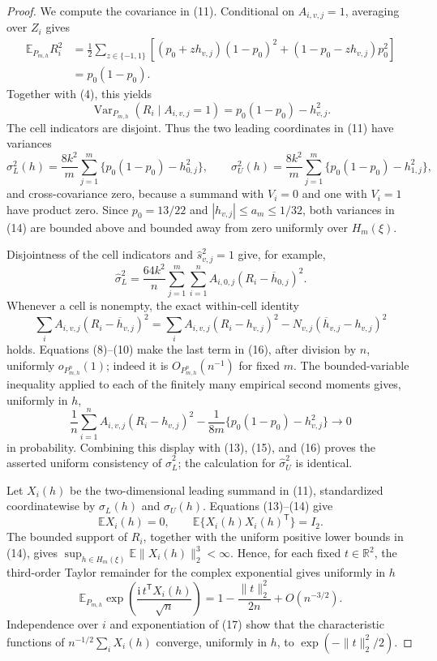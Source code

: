 \documentclass{article}
\begin{document}
\begin{proof}
We compute the covariance in (11). Conditional on \(A_{i,v,j}=1\), averaging over \(Z_i\) gives
\[
 \begin{split}
 \mathbb E_{P_{m,h}}R_i^2
 &=\frac12\sum_{z\in\{-1,1\}}
 \left[(p_0+zh_{v,j})(1-p_0)^2+(1-p_0-zh_{v,j})p_0^2\right]\\
 &=p_0(1-p_0).
 \end{split}                                                            \tag{12}
\]
Together with (4), this yields
\[
 \operatorname{Var}_{P_{m,h}}(R_i\mid A_{i,v,j}=1)
 =p_0(1-p_0)-h_{v,j}^2.                                                  \tag{13}
\]
The cell indicators are disjoint. Thus the two leading coordinates in (11) have variances
\[
 \sigma_L^2(h)=\frac{8k^2}{m}\sum_{j=1}^{m}\{p_0(1-p_0)-h_{0,j}^2\},
 \qquad
 \sigma_U^2(h)=\frac{8k^2}{m}\sum_{j=1}^{m}\{p_0(1-p_0)-h_{1,j}^2\},    \tag{14}
\]
and cross-covariance zero, because a summand with \(V_i=0\) and one with \(V_i=1\) have product zero. Since \(p_0=13/22\) and \(|h_{v,j}|\leq a_m\leq1/32\), both variances in (14) are bounded above and bounded away from zero uniformly over \(H_m(\xi)\).

Disjointness of the cell indicators and \(\widehat s_{v,j}^2=1\) give, for example,
\[
 \widehat\sigma_L^2
 =\frac{64k^2}{n}\sum_{j=1}^{m}\sum_{i=1}^{n}
 A_{i,0,j}(R_i-\overline h_{0,j})^2.                                    \tag{15}
\]
Whenever a cell is nonempty, the exact within-cell identity
\[
 \sum_iA_{i,v,j}(R_i-\overline h_{v,j})^2
 =\sum_iA_{i,v,j}(R_i-h_{v,j})^2
 -N_{v,j}(\overline h_{v,j}-h_{v,j})^2                                  \tag{16}
\]
holds. Equations (8)--(10) make the last term in (16), after division by \(n\), uniformly \(o_{P_{m,h}^{n}}(1)\); indeed it is \(O_{P_{m,h}^{n}}(n^{-1})\) for fixed \(m\). The bounded-variable inequality applied to each of the finitely many empirical second moments gives, uniformly in \(h\),
\[
 \frac1n\sum_{i=1}^{n}A_{i,v,j}(R_i-h_{v,j})^2
 -\frac1{8m}\{p_0(1-p_0)-h_{v,j}^2\}
 \longrightarrow0
\]
in probability. Combining this display with (13), (15), and (16) proves the asserted uniform consistency of \(\widehat\sigma_L^2\); the calculation for \(\widehat\sigma_U^2\) is identical.

Let \(X_i(h)\) be the two-dimensional leading summand in (11), standardized coordinatewise by \(\sigma_L(h)\) and \(\sigma_U(h)\). Equations (13)--(14) give
\[
 \mathbb E X_i(h)=0,
 \qquad \mathbb E\{X_i(h)X_i(h)^{\mathsf T}\}=I_2.
\]
The bounded support of \(R_i\), together with the uniform positive lower bounds in (14), gives \(\sup_{h\in H_m(\xi)}\mathbb E\|X_i(h)\|_2^3<\infty\). Hence, for each fixed \(t\in\mathbb R^2\), the third-order Taylor remainder for the complex exponential gives uniformly in \(h\)
\[
 \mathbb E_{P_{m,h}}\exp\left(\frac{\mathrm i\,t^{\mathsf T}X_i(h)}{\sqrt n}\right)
 =1-\frac{\|t\|_2^2}{2n}+O(n^{-3/2}).                                  \tag{17}
\]
Independence over \(i\) and exponentiation of (17) show that the characteristic functions of \(n^{-1/2}\sum_iX_i(h)\) converge, uniformly in \(h\), to \(\exp(-\|t\|_2^2/2)\).


\end{proof}
\end{document}
